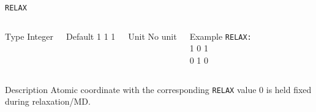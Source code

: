 \documentclass[xcolor=dvipsnames,t]{beamer}
\begin{document}
\begin{frame}[allowframebreaks]{\texttt{RELAX}} \label{RELAX}
\vspace*{-12pt}
\begin{columns}
\begin{block}{Type}
Integer
\end{block}

\begin{block}{Default}
1 1 1
\end{block}

\begin{block}{Unit}
No unit
\end{block}

\begin{block}{Example}
\texttt{RELAX: \\}
1 0 1 \\
0 1 0
\end{block}
\end{columns}

\begin{block}{Description}
Atomic coordinate with the corresponding \texttt{RELAX} value 0 is held fixed during relaxation/MD.
\end{block}

\end{frame}
\end{document}
